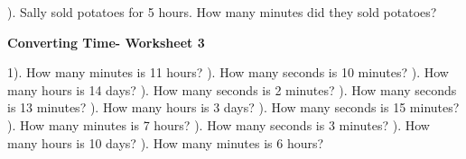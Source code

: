 \documentclass{article}%
\begin{document}
\newline%
). Sally sold potatoes for 5 hours. How many minutes did they sold potatoes?%
\newline%
\newline%
\newline%
\pagebreak%
\large%
\begin{center}%
\textbf{Converting Time- Worksheet 3}%
\newline%
\newline%
\newline%
\end{center} \normalsize%
1). How many minutes is 11 hours?%
\newline%
\newline%
). How many seconds is 10 minutes?%
\newline%
\newline%
). How many hours is 14 days?%
\newline%
\newline%
). How many seconds is 2 minutes?%
\newline%
\newline%
). How many seconds is 13 minutes?%
\newline%
\newline%
). How many hours is 3 days?%
\newline%
\newline%
). How many seconds is 15 minutes?%
\newline%
\newline%
). How many minutes is 7 hours?%
\newline%
\newline%
). How many seconds is 3 minutes?%
\newline%
\newline%
). How many hours is 10 days?%
\newline%
\newline%
). How many minutes is 6 hours?%
\newline%
\newline%
\end{document}
